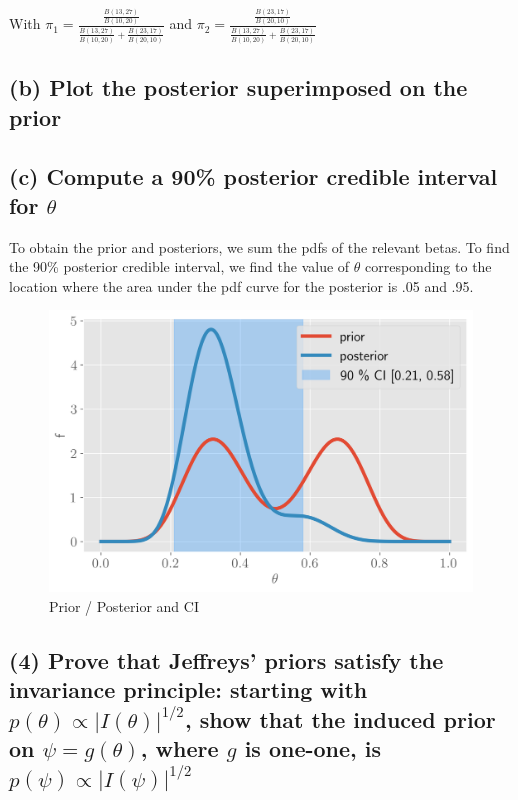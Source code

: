 \documentclass[11pt]{article}
\begin{document}
With $\pi_1 = \frac{\frac{B(13, 27)}{B(10, 20)}}{\frac{B(13, 27)}{B(10, 20)} + \frac{B(23, 17)}{B(20, 10)}}$ and  $\pi_2 = \frac{\frac{B(23, 17)}{B(20, 10)}}{\frac{B(13, 27)}{B(10, 20)} + \frac{B(23, 17)}{B(20, 10)}}$


\subsection*{(b) Plot the posterior superimposed on the prior}
\subsection*{(c) Compute a 90\% posterior credible interval for $\theta$}

To obtain the prior and posteriors, we sum the pdfs of the relevant betas. To find the 90\% posterior credible interval, we find the value of $\theta$ corresponding to the location where the area under the pdf curve for the posterior is .05 and .95. 

\begin{figure}[!h]
    \centering
    \includegraphics[scale=.6
    ]{homework_3/figures/binom.png}
    \caption{Prior / Posterior and CI}
    \label{fig:my_label}
\end{figure}

\subsection*{(4) Prove that Jeffreys’ priors satisfy the invariance principle: starting with $p(\theta) \propto |I(\theta)|^{1/2}$, show that the induced prior on $\psi = g(\theta)$, where $g$ is one-one, is
$p(\psi) \propto |I(\psi)|^{1/2}$}
\end{document}
